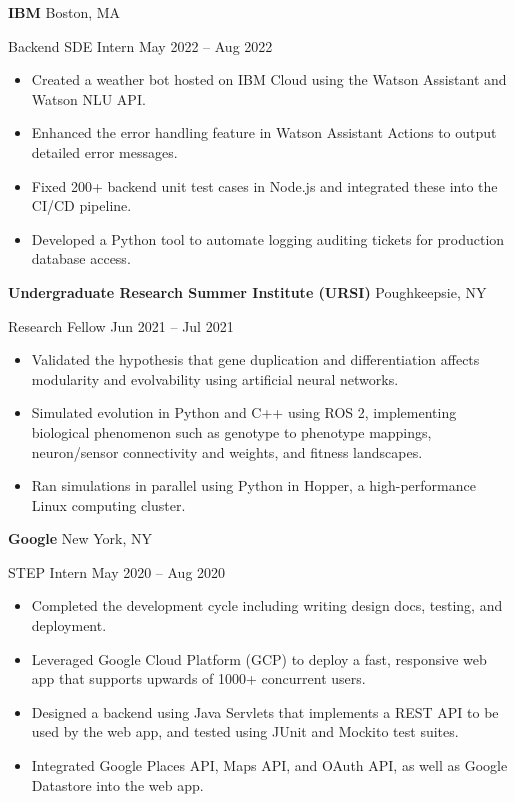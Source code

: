\documentclass[11pt]{article}
\newcommand{\resumeentry}[4]{%
\textbf{#1} \hfill {\small #2}
\par
{\small #3} \hfill {\small #4}}
\begin{document}
\resumeentry{IBM}{Boston, MA}{Backend SDE Intern}{May 2022 -- Aug 2022}
\begin{itemize}
  \item Created a weather bot hosted on IBM Cloud using the Watson Assistant and Watson NLU API.
  \item Enhanced the error handling feature in Watson Assistant Actions to output detailed error messages.
  \item Fixed 200+ backend unit test cases in Node.js and integrated these into the CI/CD pipeline.
  \item Developed a Python tool to automate logging auditing tickets for production database access.
\end{itemize}

\smallskip

\resumeentry{Undergraduate Research Summer Institute (URSI)}{Poughkeepsie, NY}{Research Fellow}{Jun 2021 -- Jul 2021}
\begin{itemize}
  \item Validated the hypothesis that gene duplication and differentiation affects modularity and evolvability using artificial neural networks.
  \item Simulated evolution in Python and C++ using ROS 2, implementing biological phenomenon such as genotype to phenotype mappings, neuron/sensor connectivity and weights, and fitness landscapes.
  \item Ran simulations in parallel using Python in Hopper, a high-performance Linux computing cluster.
\end{itemize}

\smallskip

\resumeentry{Google}{New York, NY}{STEP Intern}{May 2020 -- Aug 2020}
\begin{itemize}
  \item Completed the development cycle including writing design docs, testing, and deployment.
  \item Leveraged Google Cloud Platform (GCP) to deploy a fast, responsive web app that supports upwards of 1000+ concurrent users.
  \item Designed a backend using Java Servlets that implements a REST API to be used by the web app, and tested using JUnit and Mockito test suites.
  \item Integrated Google Places API, Maps API, and OAuth API, as well as Google Datastore into the web app.
\end{itemize}

\end{document}
